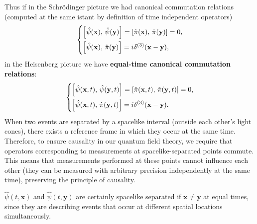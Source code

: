 Thus if in the Schrödinger picture we had canonical commutation relations (computed at the same istant by definition of time independent operators)
\[
    \begin{dcases}
        \left[\hat{\psi}(\mathbf{x}),\, \hat{\psi}(\mathbf{y})\right] = \left[\hat{\pi}(\mathbf{x}),\, \hat{\pi}(\mathbf{y})\right] = 0, \\
        \left[\hat{\psi}(\mathbf{x}),\, \hat{\pi}(\mathbf{y})\right] = i \delta^{(3)}(\mathbf{x}-\mathbf{y}),
    \end{dcases}
\]
in the Heisenberg picture we have \textbf{equal-time canonical commutation relations}:
\[
    \begin{dcases}
        \left[\hat{\psi}(\mathbf{x}, t),\, \hat{\psi}(\mathbf{y}, t)\right] = \left[\hat{\pi}(\mathbf{x}, t),\, \hat{\pi}(\mathbf{y}, t)\right] = 0, \\
        \left[\hat{\psi}(\mathbf{x}, t),\, \hat{\pi}(\mathbf{y}, t)\right] = i \delta^{(3)}(\mathbf{x}-\mathbf{y}).
    \end{dcases}
\]
When two events are separated by a spacelike interval (outside each other's light cones), there exists a reference frame in which they occur at the same time. Therefore, to ensure causality in our quantum field theory, we require that operators corresponding to measurements at spacelike-separated points commute. This means that measurements performed at these points cannot influence each other (they can be measured with arbitrary precision independently at the same time), preserving the principle of causality.

\(\hat{\psi}(t, \mathbf{x})\) and \(\hat{\psi}(t, \mathbf{y})\) are certainly spacelike separated if \(\mathbf{x} \neq \mathbf{y}\) at equal times, since they are describing events that occur at different spatial locations simultaneously.

